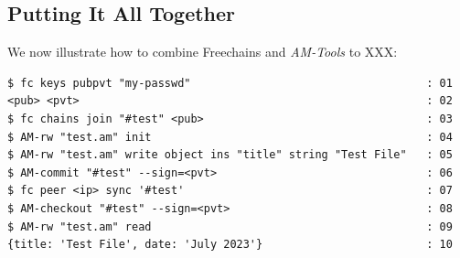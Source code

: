 \documentclass[12pt]{article}
\newcommand{\AMT}      {\emph{AM-Tools}\xspace}
\begin{document}
\subsection{Putting It All Together}

We now illustrate how to combine Freechains and \AMT to XXX:

{\footnotesize
\begin{verbatim}
$ fc keys pubpvt "my-passwd"                                    : 01
<pub> <pvt>                                                     : 02
$ fc chains join "#test" <pub>                                  : 03
$ AM-rw "test.am" init                                          : 04
$ AM-rw "test.am" write object ins "title" string "Test File"   : 05
$ AM-commit "#test" --sign=<pvt>                                : 06
$ fc peer <ip> sync '#test'                                     : 07
$ AM-checkout "#test" --sign=<pvt>                              : 08
$ AM-rw "test.am" read                                          : 09
{title: 'Test File', date: 'July 2023'}                         : 10
\end{verbatim}
}



\end{document}
